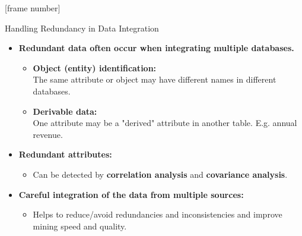 \documentclass[aspectratio=169,t]{beamer}
\begin{document}
  {
    [frame number]
    \begin{frame}{Handling Redundancy in Data Integration}
    \begin{itemize}
      \item \textbf{Redundant data often occur when integrating multiple databases.}
      \begin{itemize}
        \item \textbf{Object (entity) identification:} \\
              The same attribute or object may have different names in different databases.
        \item \textbf{Derivable data:}\\
              One attribute may be a "derived" attribute in another table. E.g. annual revenue.
      \end{itemize}
      \item \textbf{Redundant attributes:}
      \begin{itemize}
        \item Can be detected by \textbf{\color{airforceblue}correlation analysis} and \textbf{\color{airforceblue}covariance analysis}.
      \end{itemize}
      \item \textbf{Careful integration of the data from multiple sources:}
      \begin{itemize}
        \item Helps to reduce/avoid redundancies and inconsistencies and improve mining speed and quality.
      \end{itemize}
    \end{itemize}
    \end{frame}
  }
\end{document}
